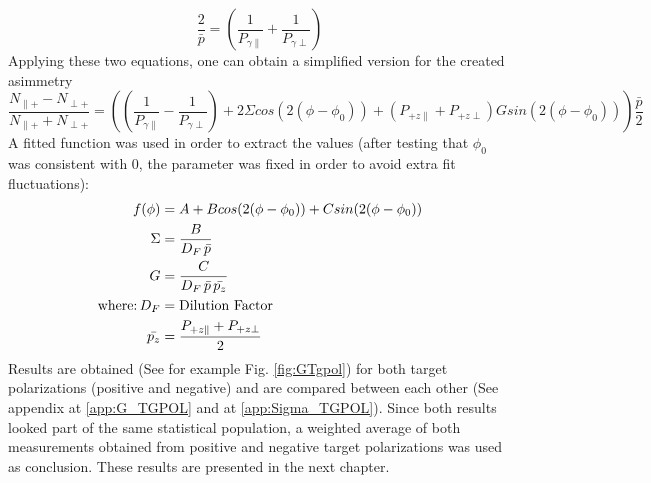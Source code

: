 \begin{equation}
  \frac{2}{\bar{p}} = \left(\frac{1}{P_{\gamma \parallel}} + \frac{1}{P_{\gamma \perp}}\right)
\end{equation}
Applying these two equations, one can obtain a simplified version for the created asimmetry
\begin{equation}
  \frac{N_{\parallel +} - N_{\perp +}}{N_{\parallel +} + N_{\perp +}} = \left( (\frac{1}{P_{\gamma \parallel}} - \frac{1}{P_{\gamma \perp}}) + 2 \Sigma cos(2(\phi-\phi_0)) +  (P_{+z\parallel}+P_{+z\perp}) G sin(2(\phi-\phi_0)) \right) \frac{\bar{p}}{2} \label{eq:A2}
\end{equation}
A fitted function was used in order to extract the values (after testing that $\phi_0$ was consistent with 0, the parameter was fixed in order to avoid extra fit fluctuations):
\begin{align}
  f(\phi) & = A + B cos(2(\phi-\phi_0)) + C sin(2(\phi-\phi_0)) \\
  \Sigma & = \frac{B}{D_F \, \bar{p}} \\
  G & = \frac{C}{D_F \, \bar{p} \,\bar{p_z}} \\
    \textnormal{where:} \, D_F & =   \textnormal{Dilution Factor} \\
    \bar{p_z} & =  \frac{P_{+z\parallel}+P_{+z\perp}}{2}
\end{align}
Results are obtained (See for example Fig. \ref{fig:GTgpol}) for both target polarizations (positive and negative) and are compared between each other (See appendix at \ref{app:G_TGPOL} and at \ref{app:Sigma_TGPOL}). Since both results looked part of the same statistical population, a weighted average of both measurements obtained from positive and negative target polarizations was used as conclusion. These results are presented in the next chapter.
